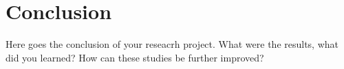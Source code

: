 \section{Conclusion} \label{sec:conclusion}

Here goes the conclusion of your reseacrh project. What were the
results, what did you learned? How can these studies be further improved?
